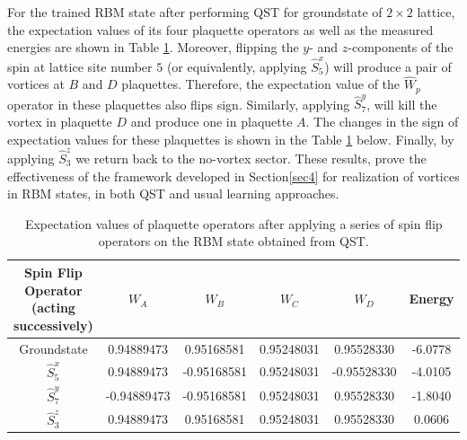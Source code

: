 \documentclass{article}
\begin{document}
For the trained RBM state after performing QST for groundstate of $2 \times 2$ lattice, the expectation values of its four plaquette operators as well as the measured energies are shown in Table \hspace{0.2mm}\ref{tab:pl0}. Moreover, flipping the $y$- and $z$-components of the spin at lattice site number $5$ (or equivalently, applying $\hat{S}_5^{x}$) will produce a pair of vortices at $B$ and $D$ plaquettes. Therefore, the expectation value of the $\hat{W}_p$ operator in these plaquettes also flips sign. Similarly, applying $\hat{S}_7^{y}$, will kill the vortex in plaquette $D$ and produce one in plaquette $A$. The changes in the sign of expectation values for these plaquettes is shown in the Table \hspace{0.2mm}\ref{tab:pl0} below. Finally, by applying $\hat{S}_3^{z}$ we return back to the no-vortex sector. These results, prove the effectiveness of the framework developed in Section\hspace{0.2mm}\ref{sec4} for realization of vortices in RBM states, in both QST and usual learning approaches.  

\begin{table}[!htb]
	\centering
	{
    \begin{tabular}{|c||c|c|c|c|c|}
    \hline
    Spin Flip Operator (acting successively)&$W_A$&$W_B$&$W_C$&$W_D$&Energy\\
    \hline \hline
    Groundstate&0.94889473&0.95168581&0.95248031&0.95528330&-6.0778\\
    \hline
    $\hat{S}_5^{x}$&0.94889473&-0.95168581&0.95248031&-0.95528330&-4.0105\\
    \hline
    $\hat{S}_7^{y}$&-0.94889473&-0.95168581&0.95248031&0.95528330&-1.8040\\
    \hline
    $\hat{S}_3^{z}$&0.94889473&0.95168581&0.95248031&0.95528330&0.0606\\
    \hline
    \end{tabular}}
	\vspace{2mm}
	\caption{\label{tab:pl0} Expectation values of plaquette operators after applying a series of spin flip operators on the RBM state obtained from QST.} 
\end{table}
\end{document}
